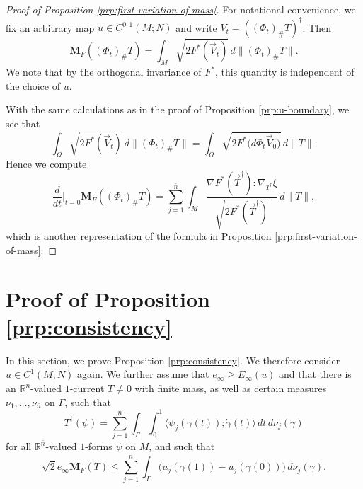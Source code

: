 \documentclass[a4paper]{article}
\newcommand{\R}{\mathbb{R}}
\newcommand{\M}{\mathbf{M}}
\newcommand{\ndim}{{\bar{n}}}
\newcommand{\pairing}[2]{\langle #1; #2 \rangle}
\theoremstyle{definition}
\theoremstyle{remark}
\begin{document}
\begin{proof}[Proof of Proposition \ref{prp:first-variation-of-mass}]
For notational convenience, we fix an arbitrary map $u \in C^{0, 1}(M; N)$ and
write $V_t = ((\Phi_t)_\# T)^\dagger$. Then
\[
\M_F((\Phi_t)_\# T) = \int_M \sqrt{2F^*(\vec{V}_t)} \, d\|(\Phi_t)_\# T\|.
\]
We note that by the orthogonal
invariance of $F^*$, this quantity is independent of the choice of $u$.

With the same calculations as in the proof of Proposition \ref{prp:u-boundary}, we see that
\[
\int_\Omega \sqrt{2F^*(\vec{V}_t)} \, d\|(\Phi_t)_\# T\| = \int_\Omega \sqrt{2F^*\bigl(d\Phi_t \vec{V}_0\bigr)} \, d\|T\|.
\]
Hence we compute
\[
\frac{d}{dt}\Bigr|_{t = 0} \M_F((\Phi_t)_\# T) = \sum_{j = 1}^\ndim \int_M \frac{\nabla F^*(\vec{T}^\dagger) : \nabla_{T^\dagger} \xi}{\sqrt{2 F^*(\vec{T}^\dagger)}} \, d\|T\|,
\]
which is another representation of the formula in Proposition \ref{prp:first-variation-of-mass}.
\end{proof}








\section{Proof of Proposition \ref{prp:consistency}} \label{sct:consistency}

In this section, we prove Proposition \ref{prp:consistency}. We therefore consider
$u \in C^1(M; N)$ again. We further assume that $e_\infty \ge E_\infty(u)$ and that there is an $\R^n$-valued $1$-current $T \neq 0$ with finite mass,
as well as certain measures $\nu_1, \dotsc, \nu_\ndim$ on $\Gamma$, such that
\begin{equation} \label{eq:representation-by-curves3}
T^\dagger(\psi) = \sum_{j = 1}^\ndim \int_\Gamma \int_0^1 \pairing{\psi_j(\gamma(t))}{\dot{\gamma}(t)} \, dt \, d\nu_j(\gamma)
\end{equation}
for all $\R^\ndim$-valued $1$-forms $\psi$ on $M$, and such that
\begin{equation} \label{eq:weak-representation-of-du2}
\sqrt{2} e_\infty \M_F(T) \le \sum_{j = 1}^\ndim \int_\Gamma \bigl(u_j(\gamma(1)) - u_j(\gamma(0))\bigr) \, d\nu_j(\gamma).
\end{equation}
\end{document}

